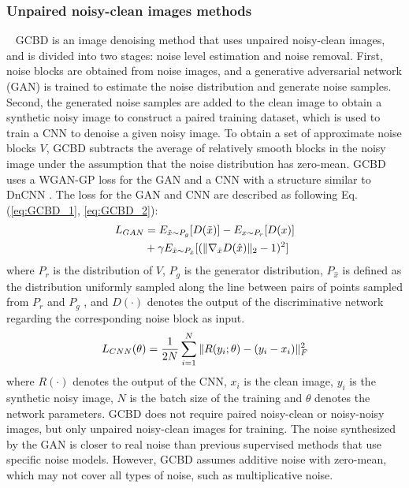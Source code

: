 \documentclass[conference]{IEEEtran}
\begin{document}
\subsubsection{Unpaired noisy-clean images methods}
\
\newline
\noindent GCBD \cite{chen2018image} is an image denoising method that uses unpaired noisy-clean images, and is divided into two stages: noise level estimation and noise removal. First, noise blocks are obtained from noise images, and a generative adversarial network (GAN) is trained to estimate the noise distribution and generate noise samples. Second, the generated noise samples are added to the clean image to obtain a synthetic noisy image to construct a paired training dataset, which is used to train a CNN to denoise a given noisy image.
To obtain a set of approximate noise blocks $V$, GCBD subtracts the average of relatively smooth blocks in the noisy image under the assumption that the noise distribution has zero-mean. 
GCBD uses a WGAN-GP \cite{gulrajani2017improved} loss for the GAN and a CNN with a structure similar to DnCNN \cite{zhang2017beyond}. The loss for the GAN and CNN are described as following Eq. (\ref{eq:GCBD_1}, \ref{eq:GCBD_2}):
\begin{equation}
	\setlength{\abovedisplayskip}{0pt}
	\setlength{\belowdisplayskip}{0pt}
	\begin{aligned}
		L_{GAN} &= E_{\tilde{x}\sim P_g}[D(\tilde{x})]-E_{x\sim P_r}[D(x)] \\
		&+ \gamma E_{\hat{x}\sim P_{\hat{x}}}[(\Vert \nabla_{\hat{x}} D(\hat{x})\Vert_2 -1)^2]
	\end{aligned}
	\label{eq:GCBD_1}
\end{equation}
where $P_r$ is the distribution of $V$, $P_g$ is the generator distribution, $P_{\hat{x}}$ is defined as the distribution uniformly sampled along the line between pairs of points sampled from $P_r$ and $P_g$ \cite{arjovsky2017wasserstein}, and $D(\cdot)$ denotes the output of the discriminative network regarding the corresponding noise block as input. 
\begin{equation}
	\setlength{\abovedisplayskip}{0pt}
	\setlength{\belowdisplayskip}{0pt}
	L_{CNN}(\theta) = \frac{1}{2N} \sum\limits_{i=1}^N\Vert R(y_i;\theta) - (y_i-x_i) \Vert_{F}^{2}
	\label{eq:GCBD_2}
\end{equation}
where $R(\cdot)$ denotes the output of the CNN, $x_i$ is the clean image, $y_i$ is the synthetic noisy image, $N$ is the batch size of the training and $\theta$ denotes the network parameters.
GCBD does not require paired noisy-clean or noisy-noisy images, but only unpaired noisy-clean images for training. The noise synthesized by the GAN is closer to real noise than previous supervised methods that use specific noise models. However, GCBD assumes additive noise with zero-mean, which may not cover all types of noise, such as multiplicative noise.
\end{document}
